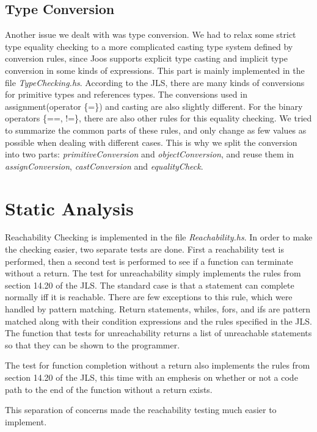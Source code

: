 \documentclass[12pt,letterpaper]{article}
\begin{document}
\subsection{Type Conversion}

Another issue we dealt with was type conversion.
We had to relax some strict type equality checking to a more complicated casting type system defined by conversion rules, since Joos supports explicit type casting and implicit type conversion in some kinds of expressions.
This part is mainly implemented in the file \emph{TypeChecking.hs}.
According to the JLS, there are many kinds of conversions for primitive types and references types.
The conversions used in assignment(operator \{=\}) and casting are also slightly different.
For the binary operators \{==, !=\}, there are also other rules for this equality checking.
We tried to summarize the common parts of these rules, and only change as few values as possible when dealing with different cases.
This is why we split the conversion into two parts: \emph{primitiveConversion} and \emph{objectConversion}, and reuse them in \emph{assignConversion}, \emph{castConversion} and \emph{equalityCheck}.


\section{Static Analysis}

Reachability Checking is implemented in the file \emph{Reachability.hs}.
In order to make the checking easier, two separate tests are done.
First a reachability test is performed, then a second test is performed to see if a function can terminate without a return.
The test for unreachability simply implements the rules from section 14.20 of the JLS.
The standard case is that a statement can complete normally iff it is reachable.
There are few exceptions to this rule, which were handled by pattern matching.
Return statements, whiles, fors, and ifs are pattern matched along with their condition expressions and the rules specified in the JLS.
The function that tests for unreachability returns a list of unreachable statements so that they can be shown to the programmer.

The test for function completion without a return also implements the rules from section 14.20 of the JLS, this time with an emphesis on whether or not a code path to the end of the function without a return exists.

This separation of concerns made the reachability testing much easier to implement.
\end{document}
